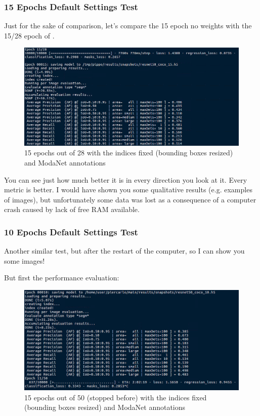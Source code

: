 \subsubsection{15 Epochs Default Settings Test}

Just for the sake of comparison, let's compare the 15 epoch no weights with the 15/28 epoch of .

\begin{figure}[H]
	\centering
	\includegraphics[width=\linewidth]{figures/train/15-28fixedindices}
	\caption{15 epochs out of 28 with the indices fixed (bounding boxes resized) and ModaNet annotations}
	\label{f:train-15-28fixedindices}
\end{figure}

You can see just how much better it is in every direction you look at it. Every metric is better. I would have shown you some qualitative results (e.g. examples of images), but unfortunately some data was lost as a consequence of a computer crash caused by lack of free RAM available.

\subsubsection{10 Epochs Default Settings Test}

Another similar test, but after the restart of the computer, so I can show you some images!

But first the performance evaluation:

\begin{figure}[H]
	\centering
	\includegraphics[width=\linewidth]{figures/train/10-50fixedindices}
	\caption{15 epochs out of 50 (stopped before) with the indices fixed (bounding boxes resized) and ModaNet annotations}
	\label{f:train-10-50fixedindices}
\end{figure}

